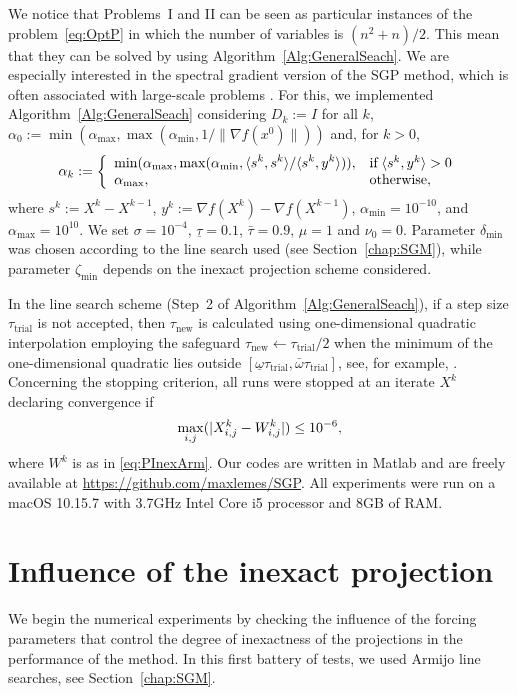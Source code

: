 We notice that Problems~I and II can be seen as particular instances of the problem~\eqref{eq:OptP} in which the number of variables is $(n^2+n)/2$. This mean that they can be solved by using Algorithm~\ref{Alg:GeneralSeach}.
We are especially interested in the spectral gradient version \cite{BirginMartinezRaydan2003,spgsiam} of the SGP method, which is often associated with large-scale problems \cite{JSSv060i03}. For this, we implemented Algorithm~\ref{Alg:GeneralSeach} considering $D_k:=I$ for all $k$, $\alpha_0 := \min(\alpha_{\max}, \max(\alpha_{\min}, 1/ \| \nabla f(x^0) \|))$ and, for $k>0$,
\begin{equation*}\label{spg}
\alpha_k:=\left\{\begin{array}{ll}
\displaystyle\min (\alpha_{\max},\max (\alpha_{\min},\langle s^k,s^k\rangle/\langle s^k,y^k\rangle)), & \mbox{if} \; \langle s^k,y^k\rangle > 0\\
\alpha_{\max}, & \mbox{otherwise},
\end{array}\right.
\end{equation*}
where $s^k:=X^k - X^{k-1}$, $y^k:=\nabla f(X^k) - \nabla f(X^{k-1})$, $\alpha_{\min}=10^{-10}$, and $\alpha_{\max}=10^{10}$.
We set $\sigma = 10^{ -4}$, $\underline\tau=0.1$, $\bar\tau=0.9$, $\mu=1$ and $\nu_0=0$. Parameter $\delta_{\min}$ was chosen according to the line search used (see Section~\ref{chap:SGM}), while parameter $\zeta_{\min}$ depends on the inexact projection scheme considered.

In the line search scheme (Step~2 of Algorithm~\ref{Alg:GeneralSeach}), if a step size $\tau_{\textrm{trial}}$  is not accepted, then $\tau_{\textrm{new}}$ is calculated using one-dimensional quadratic interpolation employing the safeguard $\tau_{\textrm{new}}\gets \tau_{\textrm{trial}}/2$  when the minimum of the one-dimensional quadratic lies outside $[\underline\omega \tau_{\textrm{trial}}, \bar\omega \tau_{\textrm{trial}} ]$, see, for example,  \cite[Section 3.5]{nocedal2006numerical}.
Concerning the stopping criterion, all runs were stopped at an iterate $X^k$ declaring convergence if
$$\displaystyle \max_{i,j} (|X^k_{i,j}-W^k_{i,j}| )\leq 10^{-6},$$ 
where $W^k$ is as in \eqref{eq:PInexArm}.
Our codes are written in Matlab and are freely available at \url{https://github.com/maxlemes/SGP}. All experiments were run on a macOS 10.15.7 with 3.7GHz Intel Core i5 processor and 8GB of RAM.
\section{Influence of the inexact projection} \label{sec:forcing}
We begin the numerical experiments by checking the influence of the forcing parameters that control the degree of inexactness of the projections in the performance of the  method. In this first battery of tests, we used Armijo line searches, see Section~\ref{chap:SGM}.

